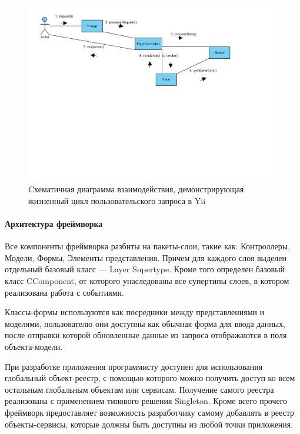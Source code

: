 \begin{figure}[!ht]
\begin{center}
\includegraphics[scale=0.6, trim=0mm 100mm 40mm 0mm, clip]{../resources/uml/YiiRequestFlow.pdf}
\caption{Cхематичная диаграмма взаимодействия, демонстрирующая жизненный цикл пользовательского запроса в Yii}
\label{gr:yiirequestflow}
\end{center}
\end{figure} 

\paragraph{Архитектура фреймворка}
Все компоненты фреймворка разбиты на пакеты-слои, такие как: Контроллеры, Модели, Формы, 
Элементы представления. Причем для каждого слоя выделен отдельный базовый класс ---
 Layer Supertype\cite{fowler}. Кроме того определен базовый класс CComponent, от которого
унаследованы все супертипы слоев, в котором реализована работа с событиями.

Классы-формы используются как посредники между представлениями и моделями, пользователю
они доступны как обычная форма для ввода данных, после отправки которой обновленные данные
из запроса отображаются в поля объекта-модели.

При разработке приложения программисту доступен для использования глобальный объект-реестр,
с помощью которого можно получить доступ ко всем остальным глобальным объектам или сервисам.
Получение самого реестра реализована с применением типового решения Singleton\cite{gamma}.
Кроме всего прочего фреймворк предоставляет возможность разработчику самому добавлять в реестр
объекты-сервисы, которые должны быть доступны из любой точки приложения. 

